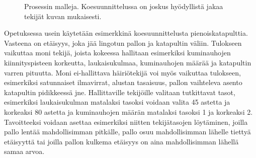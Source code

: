 \documentclass[12pt,a4paper,finnish]{tutthesis}
\begin{document}
\begin{figure}[h]
  \begin{center}

    \caption[Prosessin malleja]{Prosessin malleja. Koesuunnittelussa on joskus
    hyödyllistä jakaa tekijät kuvan mukaisesti.}

    \label{fig:prosessi1}
  \end{center}
\end{figure}





Opetuksessa usein käytetään esimerkkinä koesuunnittelusta pienoiskatapulttia.
Vasteena on etäisyys, joka jää lingotun pallon ja katapultin väliin. Tulokseen
vaikuttaa moni tekijä, joista kokeessa hallitaan esimerkiksi kuminauhojen
kiinnityspisteen korkeutta, laukaisukulmaa, kuminauhojen määrää ja katapultin
varren pituutta. Moni ei-hallittava häiriötekijä
voi myös vaikuttaa tulokseen, esimerkiksi satunnaiset ilmavirrat, alustan tasaisuus,
pallon vaihteleva asento katapultin pidikkeessä jne. Hallittaville tekijöille
valitaan tutkittavat tasot, esimerkiksi laukaisukulman matalaksi tasoksi voidaan
valita 45 astetta ja korkeaksi 80 astetta ja kuminauhojen määrän matalaksi
tasoksi 1 ja korkeaksi 2. Tavoitteeksi voidaan asettaa esimerkiksi niitten
tekijätasojen löytäminen, joilla pallo lentää mahdollisimman pitkälle,
pallo osuu mahdollisimman lähelle tiettyä etäisyyttä tai joilla
pallon kulkema etäisyys on aina mahdollisimman lähellä samaa arvoa.
\end{document}

